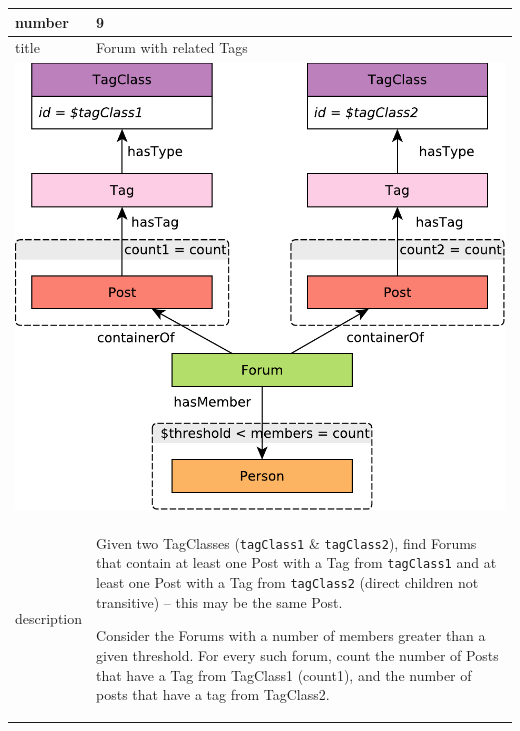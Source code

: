 \renewcommand*{\arraystretch}{1.5}
\noindent\begin{tabularx}{17cm}{|p{1.95cm}|X|}
	\hline
	number      & 9                                                          \\ \hline
	title       & Forum with related Tags                                                           \\ \hline
	\multicolumn{2}{|c|}{ \includegraphics[scale=\patternscale,margin=0cm .2cm]{patterns/q09}} \\ \hline
	description & Given two TagClasses (\texttt{tagClass1} \& \texttt{tagClass2}), find
Forums that contain at least one Post with a Tag from \texttt{tagClass1}
and at least one Post with a Tag from \texttt{tagClass2} (direct
children not transitive) -- this may be the same Post.

Consider the Forums with a number of members greater than a given
threshold. For every such forum, count the number of Posts that have a
Tag from TagClass1 (count1), and the number of posts that have a tag
from TagClass2.
 \\ \hline
	

\end{tabularx}
